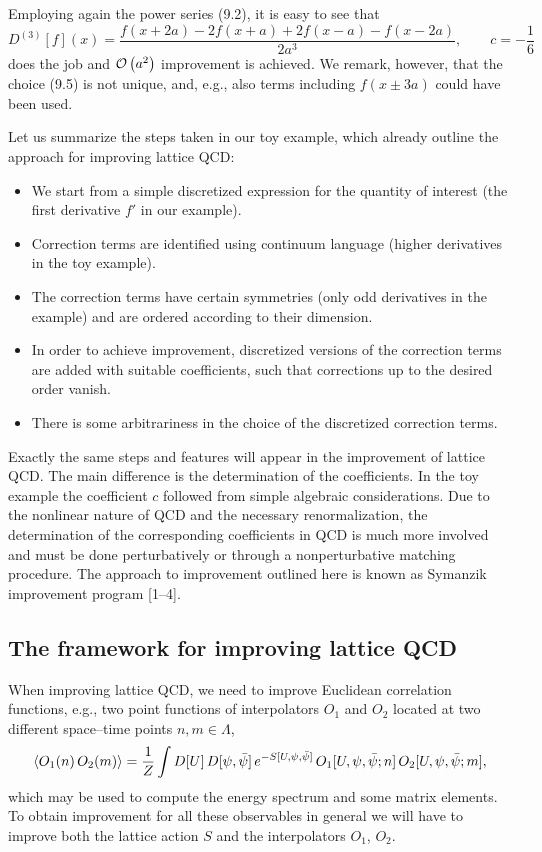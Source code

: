 Employing again the power series (9.2), it is easy to see that
\begin{equation}
  D^{(3)}[f](x) = \frac{f(x+2a) - 2f(x+a) + 2f(x-a) - f(x-2a)}{2a^3} ,
  \qquad c = -\frac{1}{6}
\end{equation}
does the job and $\mathcal{O}\left(a^2\right)$ improvement is achieved. We remark, however,
that the choice (9.5) is not unique, and, e.g., also terms including
$f(x\pm 3a)$ could have been used.

Let us summarize the steps taken in our toy example, which already outline the
approach for improving lattice QCD:
\begin{itemize}
  \item We start from a simple discretized expression for the quantity of
        interest (the first derivative $f'$ in our example).
  \item Correction terms are identified using continuum language (higher
        derivatives in the toy example).
  \item The correction terms have certain symmetries (only odd derivatives in
        the example) and are ordered according to their dimension.
  \item In order to achieve improvement, discretized versions of the
        correction terms are added with suitable coefficients, such that
        corrections up to the desired order vanish.
  \item There is some arbitrariness in the choice of the discretized
        correction terms.
\end{itemize}

Exactly the same steps and features will appear in the improvement of lattice
QCD. The main difference is the determination of the coefficients. In the toy
example the coefficient $c$ followed from simple algebraic considerations. Due
to the nonlinear nature of QCD and the necessary renormalization, the
determination of the corresponding coefficients in QCD is much more involved
and must be done perturbatively or through a nonperturbative matching
procedure. The approach to improvement outlined here is known as Symanzik
improvement program [1--4].

\subsection{The framework for improving lattice QCD}
\label{sec:9.1.2}

When improving lattice QCD, we need to improve Euclidean correlation
functions, e.g., two point functions of interpolators $O_1$ and $O_2$ located
at two different space--time points $n, m \in \Lambda$,
\begin{equation}
  \left\langle O_1(n)\,O_2(m) \right\rangle
  = \frac{1}{Z}\int D[U]\,D[\psi,\bar\psi]\,
    e^{-S[U,\psi,\bar\psi]}\,O_1[U,\psi,\bar\psi;n]\,O_2[U,\psi,\bar\psi;m] ,
\end{equation}
which may be used to compute the energy spectrum and some matrix elements. To
obtain improvement for all these observables in general we will have to
improve both the lattice action $S$ and the interpolators $O_1$, $O_2$.

